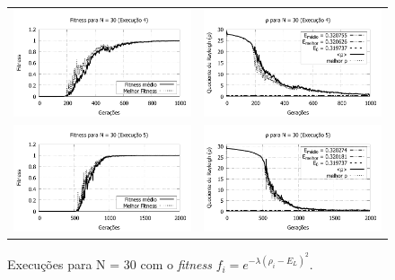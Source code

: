 \begin{figure}[p]
\begin{tabular}{@{}cc@{}}
		\includegraphics[width=.40\textwidth]{figs/resultados/fitnessEL/N-30_E-4_fitness-extendido.pdf} &
    \includegraphics[width=.40\textwidth]{figs/resultados/fitnessEL/N-30_E-4_rho_extendido.pdf} \\
		\includegraphics[width=.40\textwidth]{figs/resultados/fitnessEL/N-30_E-5_fitness-extendido.pdf} &
    \includegraphics[width=.40\textwidth]{figs/resultados/fitnessEL/N-30_E-5_rho_extendido.pdf}
  \end{tabular}
  \caption{Execuções para N = 30 com o \textit{fitness} $f_i = e^{-\lambda(\rho_i - E_L)^2}$.}
	\label{fig:execucoes_N30_EL}
	\end{figure}
	
